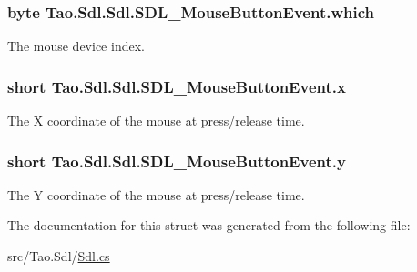 \hypertarget{struct_tao_1_1_sdl_1_1_sdl_1_1_s_d_l___mouse_button_event_a09f1d658c8d4c53a52238cbd995227ad}{
\subsubsection[{which}]{\setlength{\rightskip}{0pt plus 5cm}byte {\bf Tao.Sdl.Sdl.SDL\_\-MouseButtonEvent.which}}}
\label{struct_tao_1_1_sdl_1_1_sdl_1_1_s_d_l___mouse_button_event_a09f1d658c8d4c53a52238cbd995227ad}


The mouse device index. 

\hypertarget{struct_tao_1_1_sdl_1_1_sdl_1_1_s_d_l___mouse_button_event_a763a7a3847b0348d2353c33207c6ffea}{
\subsubsection[{x}]{\setlength{\rightskip}{0pt plus 5cm}short {\bf Tao.Sdl.Sdl.SDL\_\-MouseButtonEvent.x}}}
\label{struct_tao_1_1_sdl_1_1_sdl_1_1_s_d_l___mouse_button_event_a763a7a3847b0348d2353c33207c6ffea}


The X coordinate of the mouse at press/release time. 

\hypertarget{struct_tao_1_1_sdl_1_1_sdl_1_1_s_d_l___mouse_button_event_a287e7c64bf03edbeb1cb8044ae0455b7}{
\subsubsection[{y}]{\setlength{\rightskip}{0pt plus 5cm}short {\bf Tao.Sdl.Sdl.SDL\_\-MouseButtonEvent.y}}}
\label{struct_tao_1_1_sdl_1_1_sdl_1_1_s_d_l___mouse_button_event_a287e7c64bf03edbeb1cb8044ae0455b7}


The Y coordinate of the mouse at press/release time. 



The documentation for this struct was generated from the following file:\begin{DoxyCompactItemize}
\item 
src/Tao.Sdl/\hyperlink{_sdl_8cs}{Sdl.cs}\end{DoxyCompactItemize}
